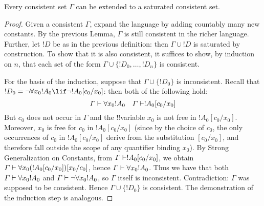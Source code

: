 \documentclass[../../include/open-logic-section]{subfiles}
\begin{document}
\begin{thm}
  Every consistent set $\Gamma$ can be extended to a saturated
  consistent set.
\end{thm}

\begin{proof}
Given a consistent $\Gamma$, expand the language by adding countably
many new constants. By the previous Lemma, $\Gamma$ is still
consistent in the richer language. Further, let $!D$ be as in the
previous definition: then $\Gamma \cup !D$ is saturated by
construction. To show that it is also consistent, it suffices to show,
by induction on $n$, that each set of the form $\Gamma \cup \{
!D_0, \dots, !D_n \}$ is consistent.

For the basis of the induction, suppose that $\Gamma \cup \{ !D_0
\}$ is inconsistent. Recall that $!D_0 = \lnot \lforall[x_0] !A_0
\lif \lnot !A_0 [c_0/x_0]$: then both of the following hold:
\[
\Gamma \Proves \lforall[x_0] !A_0
\quad
\Gamma \Proves !A_0[c_0/x_0]
\]
But $c_0$ does not occur in $\Gamma$ and the !!{variable} $x_0$ is not
free in $!A_0 [ c_0/x_0]$. Moreover, $x_0$ is free for $c_0$ in $!A_0
[c_0/x_0]$ (since by the choice of $c_0$, the only occurrences of
$c_0$ in $!A_0 [c_0/x_0]$ derive from the substitution $[c_0/x_0]$,
and therefore fall outside the scope of any quantifier binding
$x_0$). By Strong Generalization on Constants, from $\Gamma \Proves
!A_0 [c_0/x_0]$, we obtain $\Gamma \Proves \lforall[x_0] ( !A_0
[c_0/x_0] ) [x_0/c_0]$, hence $\Gamma \Proves \lforall[x_0]
!A_0$. Thus we have that both $\Gamma \Proves \lforall[x_0] !A_0$ and
$\Gamma \Proves \lnot \lforall[x_0] !A_0$, so $\Gamma$ itself is
inconsistent. Contradiction: $\Gamma$ was supposed to be
consistent. Hence $\Gamma \cup \{ !D_0\}$ is consistent. The
demonstration of the induction step is analogous.
\end{proof}
\end{document}
